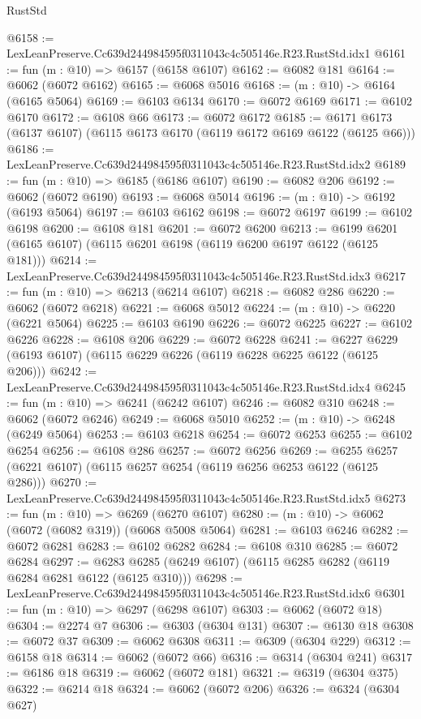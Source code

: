 \begin{lexlean}{RustStd}
\begin{coremodule}
@6158 := LexLeanPreserve.Cc639d244984595f0311043c4c505146e.R23.RustStd.idx1
@6161 := fun (m : @10) => @6157 (@6158 @6107)
@6162 := @6082 @181
@6164 := @6062 (@6072 @6162)
@6165 := @6068 @5016
@6168 := (m : @10) -> @6164 (@6165 @5064)
@6169 := @6103 @6134
@6170 := @6072 @6169
@6171 := @6102 @6170
@6172 := @6108 @66
@6173 := @6072 @6172
@6185 := @6171 @6173 (@6137 @6107) (@6115 @6173 @6170 (@6119 @6172 @6169 @6122 (@6125 @66)))
@6186 := LexLeanPreserve.Cc639d244984595f0311043c4c505146e.R23.RustStd.idx2
@6189 := fun (m : @10) => @6185 (@6186 @6107)
@6190 := @6082 @206
@6192 := @6062 (@6072 @6190)
@6193 := @6068 @5014
@6196 := (m : @10) -> @6192 (@6193 @5064)
@6197 := @6103 @6162
@6198 := @6072 @6197
@6199 := @6102 @6198
@6200 := @6108 @181
@6201 := @6072 @6200
@6213 := @6199 @6201 (@6165 @6107) (@6115 @6201 @6198 (@6119 @6200 @6197 @6122 (@6125 @181)))
@6214 := LexLeanPreserve.Cc639d244984595f0311043c4c505146e.R23.RustStd.idx3
@6217 := fun (m : @10) => @6213 (@6214 @6107)
@6218 := @6082 @286
@6220 := @6062 (@6072 @6218)
@6221 := @6068 @5012
@6224 := (m : @10) -> @6220 (@6221 @5064)
@6225 := @6103 @6190
@6226 := @6072 @6225
@6227 := @6102 @6226
@6228 := @6108 @206
@6229 := @6072 @6228
@6241 := @6227 @6229 (@6193 @6107) (@6115 @6229 @6226 (@6119 @6228 @6225 @6122 (@6125 @206)))
@6242 := LexLeanPreserve.Cc639d244984595f0311043c4c505146e.R23.RustStd.idx4
@6245 := fun (m : @10) => @6241 (@6242 @6107)
@6246 := @6082 @310
@6248 := @6062 (@6072 @6246)
@6249 := @6068 @5010
@6252 := (m : @10) -> @6248 (@6249 @5064)
@6253 := @6103 @6218
@6254 := @6072 @6253
@6255 := @6102 @6254
@6256 := @6108 @286
@6257 := @6072 @6256
@6269 := @6255 @6257 (@6221 @6107) (@6115 @6257 @6254 (@6119 @6256 @6253 @6122 (@6125 @286)))
@6270 := LexLeanPreserve.Cc639d244984595f0311043c4c505146e.R23.RustStd.idx5
@6273 := fun (m : @10) => @6269 (@6270 @6107)
@6280 := (m : @10) -> @6062 (@6072 (@6082 @319)) (@6068 @5008 @5064)
@6281 := @6103 @6246
@6282 := @6072 @6281
@6283 := @6102 @6282
@6284 := @6108 @310
@6285 := @6072 @6284
@6297 := @6283 @6285 (@6249 @6107) (@6115 @6285 @6282 (@6119 @6284 @6281 @6122 (@6125 @310)))
@6298 := LexLeanPreserve.Cc639d244984595f0311043c4c505146e.R23.RustStd.idx6
@6301 := fun (m : @10) => @6297 (@6298 @6107)
@6303 := @6062 (@6072 @18)
@6304 := @2274 @7
@6306 := @6303 (@6304 @131)
@6307 := @6130 @18
@6308 := @6072 @37
@6309 := @6062 @6308
@6311 := @6309 (@6304 @229)
@6312 := @6158 @18
@6314 := @6062 (@6072 @66)
@6316 := @6314 (@6304 @241)
@6317 := @6186 @18
@6319 := @6062 (@6072 @181)
@6321 := @6319 (@6304 @375)
@6322 := @6214 @18
@6324 := @6062 (@6072 @206)
@6326 := @6324 (@6304 @627)

\end{coremodule}
\end{lexlean}
